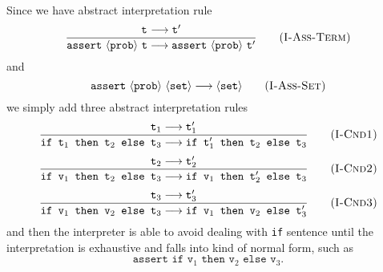 \documentclass[a4paper]{article}
\begin{document}
\paragraph{}
Since we have abstract interpretation rule
\begin{equation}
	\frac{\text{\tt t}_{}\longrightarrow\text{\tt t}^{\prime}_{}}
	{\text{\tt assert}\ \langle\text{\tt prob}\rangle\ \text{\tt t}\longrightarrow\text{\tt assert}\ \langle\text{\tt prob}\rangle\ \text{\tt t}^\prime}
	\tag{\sc I-Ass-Term}
\end{equation}
and
\begin{equation}
	\text{\tt assert}\ \langle\text{\tt prob}\rangle\ \langle\text{\tt set}\rangle\longrightarrow\langle\text{\tt set}\rangle
	\tag{\sc I-Ass-Set}
\end{equation}
we simply add three abstract interpretation rules
\begin{equation}
	\frac{\text{\tt t}_1\longrightarrow\text{\tt t}^{\prime}_1}
	{\text{\tt if t$_1$ then t$_2$ else t$_3$}\longrightarrow
	\text{\tt if t$^\prime_1$ then t$_2$ else t$_3$}}
	\tag{\sc I-Cnd1}
\end{equation}
\begin{equation}
	\frac{\text{\tt t}_2\longrightarrow\text{\tt t}^{\prime}_2}
	{\text{\tt if v$_1$ then t$_2$ else t$_3$}\longrightarrow
	\text{\tt if v$_1$ then t$^\prime_2$ else t$_3$}}
	\tag{\sc I-Cnd2}
\end{equation}
\begin{equation}
	\frac{\text{\tt t}_3\longrightarrow\text{\tt t}^{\prime}_3}
	{\text{\tt if v$_1$ then v$_2$ else t$_3$}\longrightarrow
	\text{\tt if v$_1$ then v$_2$ else t$^\prime_3$}}
	\tag{\sc I-Cnd3}
\end{equation}
and then the interpreter is able to avoid dealing with \texttt{if} sentence until the interpretation is exhaustive and falls into kind of normal form, such as $$\texttt{assert if v$_1$ then v$_2$ else v$_3$}.$$
\end{document}
